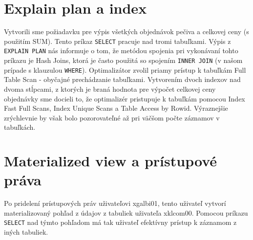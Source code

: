 \documentclass[11pt,a4paper]{article}
\begin{document}
\section{Explain plan a index}
Vytvorili sme požiadavku pre výpis všetkých objednávok pečiva a celkovej ceny (s použitím SUM). Tento príkaz \texttt{SELECT} pracuje nad tromi tabuľkami. Výpis z \texttt{EXPLAIN PLAN} nás informuje o tom, že metódou spojenia pri vykonávaní tohto príkazu je Hash Joins, ktorá je často použitá so spojením \texttt{INNER JOIN} (v našom prípade s klauzulou \texttt{WHERE}). Optimalizátor zvolil priamy prístup k tabuľkám Full Table Scan - obyčajné prechádzanie tabuľkami. Vytvorením dvoch indexov nad dvoma stĺpcami, z ktorých je braná hodnota pre výpočet celkovej ceny objednávky sme docieli to, že optimalizér pristupuje k tabuľkám pomocou Index Fast Full Scans, Index Unique Scans a Table Access by Rowid. Výraznejšie zrýchlevnie by však bolo pozorovateľné až pri väčšom počte záznamov v tabuľkách. 

\section*{Materialized view a prístupové práva}
Po pridelení prístupových práv uživateľovi xgalbi01, tento uživateľ vytvorí materializovaný pohľad z údajov z tabuliek uživateľa xklcom00. Pomocou príkazu \texttt{SELECT} nad týmto pohľadom má tak uživateľ efektívny prístup k záznamom z iných tabuliek.
\end{document}
